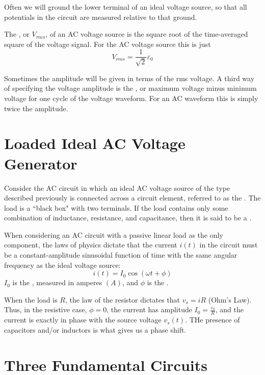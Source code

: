 Often we will ground the lower terminal of an ideal voltage source, so that all potentials in the circuit are measured relative to that ground. 

\begin{defn}
    The , or $V_{rms}$, of an AC voltage source is the square root of the time-averaged square of the voltage signal. For the AC voltage source this is just $$V_{rms} = \frac{1}{\sqrt{2}}\varepsilon_0$$
\end{defn}

Sometimes the amplitude will be given in terms of the rms voltage. A third way of specifying the voltage amplitude is the , or maximum voltage minus minimum voltage for one cycle of the voltage waveform. For an AC waveform this is simply twice the amplitude.

\section{Loaded Ideal AC Voltage Generator}

Consider the AC circuit in which an ideal AC voltage source of the type described previously is connected across a circuit element, referred to as the . The load is a ``black box" with two terminals. If the load contains only some combination of inductance, resistance, and capacitance, then it is said to be a .

\begin{prop}
    When considering an AC circuit with a passive linear load as the only component, the laws of physics dictate that the current $i(t)$ in the circuit must be a constant-amplitude sinusoidal function of time with the same angular frequency as the ideal voltage source: $$i(t) = I_0\cos(\omega t+\phi)$$
    $I_0$ is the , measured in amperes $(A)$, and $\phi$ is the .
\end{prop}

When the load is  $R$, the law of the resistor dictates that $v_s = iR$ (Ohm's Law). Thus, in the resistive case, $\phi = 0$, the current has amplitude $I_0 = \frac{\varepsilon_0}{R}$, and the current is exactly in phase with the source voltage $v_s(t)$. THe presence of capacitors and/or inductors is what gives us a phase shift.

\section{Three Fundamental Circuits}

